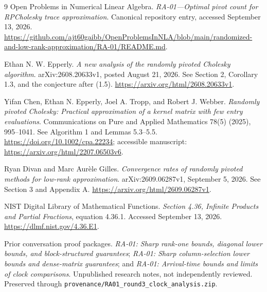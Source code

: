 \documentclass[11pt]{article}
\theoremstyle{remark}\newtheorem{remark}[theorem]{Remark}
\begin{document}
\clearpage
\begin{thebibliography}{9}
 Open Problems in Numerical Linear Algebra. \emph{RA-01---Optimal pivot count for RPCholesky trace approximation}. Canonical repository entry, accessed September 13, 2026.\newline
\url{https://github.com/ajt60gaibb/OpenProblemsInNLA/blob/main/randomized-and-low-rank-approximation/RA-01/README.md}.

 Ethan N. W. Epperly. \emph{A new analysis of the randomly pivoted Cholesky algorithm}. arXiv:2608.20633v1, posted August 21, 2026. See Section 2, Corollary 1.3, and the conjecture after (1.5).\newline
\url{https://arxiv.org/html/2608.20633v1}.

 Yifan Chen, Ethan N. Epperly, Joel A. Tropp, and Robert J. Webber. \emph{Randomly pivoted Cholesky: Practical approximation of a kernel matrix with few entry evaluations}. Communications on Pure and Applied Mathematics 78(5) (2025), 995--1041. See Algorithm 1 and Lemmas 5.3--5.5.\newline
\url{https://doi.org/10.1002/cpa.22234}; accessible manuscript:
\url{https://arxiv.org/html/2207.06503v6}.

 Ryan Divan and Marc Aur\`ele Gilles. \emph{Convergence rates of randomly pivoted methods for low-rank approximation}. arXiv:2609.06287v1, September 5, 2026. See Section 3 and Appendix A.\newline
\url{https://arxiv.org/html/2609.06287v1}.

 NIST Digital Library of Mathematical Functions. \emph{Section 4.36, Infinite Products and Partial Fractions}, equation 4.36.1. Accessed September 13, 2026.\newline
\url{https://dlmf.nist.gov/4.36.E1}.

 Prior conversation proof packages. \emph{RA-01: Sharp rank-one bounds, diagonal lower bounds, and block-structured guarantees}; \emph{RA-01: Sharp column-selection lower bounds and dense-matrix guarantees}; and \emph{RA-01: Arrival-time bounds and limits of clock comparisons}. Unpublished research notes, not independently reviewed. Preserved through \texttt{provenance/RA01\_round3\_clock\_analysis.zip}.
\end{thebibliography}
\end{document}
